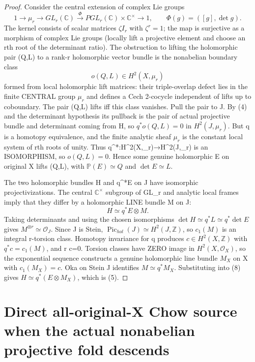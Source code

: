 \documentclass[11pt]{article}
\begin{document}
\begin{proof}
Consider the central extension of complex Lie groups
\[
 1\longrightarrow \mu_r
 \longrightarrow GL_r(\mathbb C)
 \overset{\Phi}{\longrightarrow}
 PGL_r(\mathbb C)\times\mathbb C^\times
 \longrightarrow1,\qquad
 \Phi(g)=([g],\det g).
                                                             \tag{6}
\]
The kernel consists of scalar
matrices $\zeta I_r$ with
$\zeta^r=1$; the map is
surjective as a morphism of
complex Lie groups (locally
lift a projective element and
choose an rth root of the
determinant ratio).
The obstruction to lifting the
holomorphic pair (Q,L) to
a rank-r holomorphic vector
bundle is the nonabelian
boundary class
\[
   o(Q,L)\in H^2(X,\mu_r)
                                                             \tag{7}
\]
formed from local holomorphic
lift matrices: their triple-overlap
defect lies in the finite CENTRAL
group $\mu_r$ and defines a
Cech 2-cocycle independent of lifts
up to coboundary. The pair (Q,L)
lifts iff this class vanishes.
Pull the pair to J. By (4) and
the determinant hypothesis its
pullback is the pair of actual
projective bundle and determinant
coming from H, so
$q^*o(Q,L)=0$ in $H^2(J,\mu_r)$.
But q is a homotopy equivalence,
and the finite analytic sheaf
$\mu_r$ is the constant local
system of rth roots of unity.
Thus q^*:H^2(X,\mu_r)→H^2(J,\mu_r)
is an ISOMORPHISM, so
$o(Q,L)=0$. Hence some genuine
holomorphic E on original X lifts
(Q,L), with $\mathbb P(E)\simeq Q$
and $\det E\simeq L$.

The two holomorphic bundles H
and q^*E on J have isomorphic
projectivizations. The central
$\mathbb C^\times$ subgroup of GL_r
and analytic local frames imply
that they differ by a holomorphic
LINE bundle M on J:
\[
    H\simeq q^*E\otimes M.
                                                             \tag{8}
\]
Taking determinants and using the
chosen isomorphisms $\det H\simeq
q^*L\simeq q^*\det E$ gives
$M^{\otimes r}\simeq\mathcal O_J$.
Since J is Stein,
$\operatorname{Pic}_{hol}(J)
\simeq H^2(J,\mathbb Z)$,
so $c_1(M)$ is an integral
r-torsion class. Homotopy
invariance for q produces
$c\in H^2(X,\mathbb Z)$
with $q^*c=c_1(M)$, and r c=0.
Torsion classes have ZERO image
in $H^2(X,\mathcal O_X)$,
so the exponential sequence
constructs a genuine holomorphic
line bundle $M_X$ on X with
$c_1(M_X)=c$. Oka on Stein J
identifies $M\simeq q^*M_X$.
Substituting into (8) gives
$H\simeq q^*(E\otimes M_X)$,
which is (5).
\end{proof}

\section{Direct all-original-X Chow source when the actual nonabelian projective fold descends}
\end{document}
